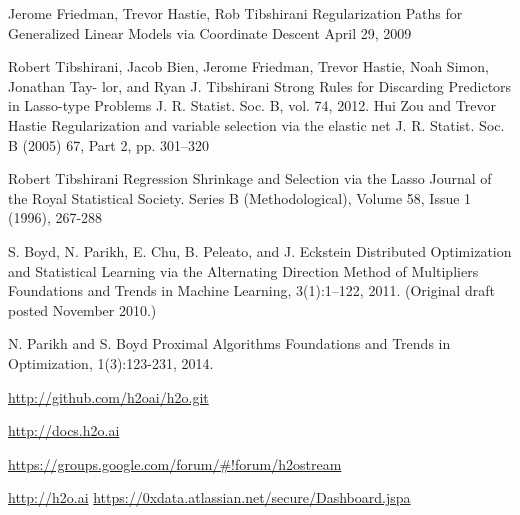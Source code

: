 \documentclass[11pt]{article}
\begin{document}
\begin{thebibliography}{9}

Jerome Friedman, Trevor Hastie, Rob Tibshirani
Regularization Paths for Generalized Linear Models via Coordinate Descent
April 29, 2009

  Robert Tibshirani, Jacob Bien, Jerome Friedman, Trevor Hastie, Noah Simon, Jonathan Tay- lor, and Ryan J. Tibshirani
  Strong Rules for Discarding Predictors in Lasso-type Problems
  J. R. Statist. Soc. B, vol. 74, 
  2012.
Hui Zou and Trevor Hastie
Regularization and variable selection via the elastic net
J. R. Statist. Soc. B (2005) 67, Part 2, pp. 301–320

Robert Tibshirani
Regression Shrinkage and Selection via the Lasso
Journal of the Royal Statistical Society. Series B (Methodological), Volume 58, Issue 1 (1996), 267-288

S. Boyd, N. Parikh, E. Chu, B. Peleato, and J. Eckstein
Distributed Optimization and Statistical Learning via the Alternating Direction Method of Multipliers
Foundations and Trends in Machine Learning, 3(1):1–122, 2011. (Original draft posted November 2010.)

N. Parikh and S. Boyd
Proximal Algorithms
Foundations and Trends in Optimization, 1(3):123-231, 2014.

\url{http://github.com/h2oai/h2o.git}

\url{http://docs.h2o.ai}

\url{https://groups.google.com/forum/#!forum/h2ostream}

\url{http://h2o.ai}
\url{https://0xdata.atlassian.net/secure/Dashboard.jspa}
\end{thebibliography}

\end{document}
